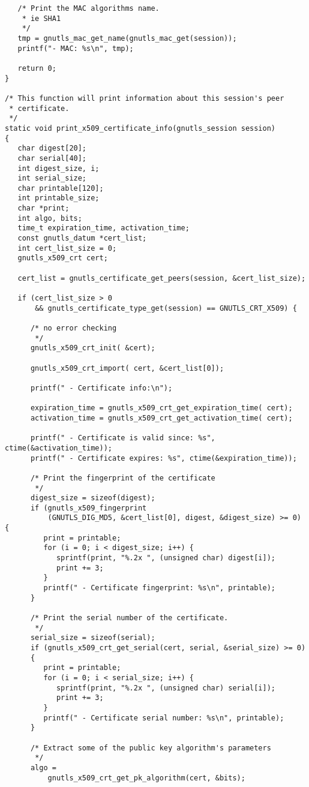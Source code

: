 \begin{verbatim}
   /* Print the MAC algorithms name.
    * ie SHA1
    */
   tmp = gnutls_mac_get_name(gnutls_mac_get(session));
   printf("- MAC: %s\n", tmp);

   return 0;
}

/* This function will print information about this session's peer
 * certificate. 
 */
static void print_x509_certificate_info(gnutls_session session)
{
   char digest[20];
   char serial[40];
   int digest_size, i;
   int serial_size;
   char printable[120];
   int printable_size;
   char *print;
   int algo, bits;
   time_t expiration_time, activation_time;
   const gnutls_datum *cert_list;
   int cert_list_size = 0;
   gnutls_x509_crt cert;

   cert_list = gnutls_certificate_get_peers(session, &cert_list_size);

   if (cert_list_size > 0
       && gnutls_certificate_type_get(session) == GNUTLS_CRT_X509) {

      /* no error checking
       */
      gnutls_x509_crt_init( &cert);

      gnutls_x509_crt_import( cert, &cert_list[0]);

      printf(" - Certificate info:\n");

      expiration_time = gnutls_x509_crt_get_expiration_time( cert);
      activation_time = gnutls_x509_crt_get_activation_time( cert);

      printf(" - Certificate is valid since: %s", ctime(&activation_time));
      printf(" - Certificate expires: %s", ctime(&expiration_time));

      /* Print the fingerprint of the certificate
       */
      digest_size = sizeof(digest);
      if (gnutls_x509_fingerprint
          (GNUTLS_DIG_MD5, &cert_list[0], digest, &digest_size) >= 0) {
         print = printable;
         for (i = 0; i < digest_size; i++) {
            sprintf(print, "%.2x ", (unsigned char) digest[i]);
            print += 3;
         }
         printf(" - Certificate fingerprint: %s\n", printable);
      }

      /* Print the serial number of the certificate.
       */
      serial_size = sizeof(serial);
      if (gnutls_x509_crt_get_serial(cert, serial, &serial_size) >= 0) 
      {
         print = printable;
         for (i = 0; i < serial_size; i++) {
            sprintf(print, "%.2x ", (unsigned char) serial[i]);
            print += 3;
         }
         printf(" - Certificate serial number: %s\n", printable);
      }

      /* Extract some of the public key algorithm's parameters
       */
      algo =
          gnutls_x509_crt_get_pk_algorithm(cert, &bits);


\end{verbatim}
